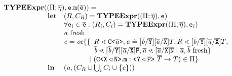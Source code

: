 \documentclass[a4paper,USenglish,cleveref, autoref, thm-restate]{lipics-v2021}
\begin{document}
\noindent
$\begin{array}{@{}l@{}l}
\typeExpr{} & (({\mtypeEnvironment} ;
  \overline{\localVarAssumption}), \texttt{e}.\mathtt{m}(\overline{\texttt{e}}) ) = \\
& \begin{array}{ll}
\textbf{let}& ({R}, \consSet_R) = \typeExpr(({\mtypeEnvironment} ;
  \overline{\localVarAssumption}), \texttt{e})\\
& \forall \texttt{e}_i \in \ol{e} : (R_i, \consSet_i) = \typeExpr(({\mtypeEnvironment} ;
  \overline{\localVarAssumption}), \texttt{e}_i)  \\
                    & \tv{a} \text{ fresh} \\
& \begin{array}{@{}l@{}l}
  \constraint = \orCons\set{ & \{
            \begin{array}[t]{l}
              {R} \lessdot \exptype{C}{\ol{\tv{a}}}, \tv{a} \doteq [\ol{\tv{b}}/\ol{Y}][\ol{\tv{a}}/\ol{X}]{T},
              \overline{R} \lessdot [\ol{\tv{b}}/\ol{Y}][\ol{\tv{a}}/\ol{X}]\overline{T} , \\
              \ol{\tv{b}} \lessdot [\ol{\tv{b}}/\ol{Y}][\ol{\tv{a}}/\ol{X}]\ol{P} ,
              \ol{\tv{a}} \lessdot [\ol{\tv{a}}/\ol{X}]\ol{N}
              \mid \overline{\tv{a}}, \overline{\tv{b}} \text{ fresh} \}
            \end{array}\\
      & \ |\ (\exptype{C}{\ol{X} \triangleleft \ol{N}}.\texttt{m} : \exptype{}{\ol{Y} \triangleleft \ol{P}} \ \overline{T} \to {T}) \in {\mtypeEnvironment} }
  \end{array}\\
\mathbf{in} & (\tv{a},(\consSet_R \cup \bigcup_i \consSet_i \cup \set{\constraint}))
\end{array}
\end{array}
$
\end{document}
